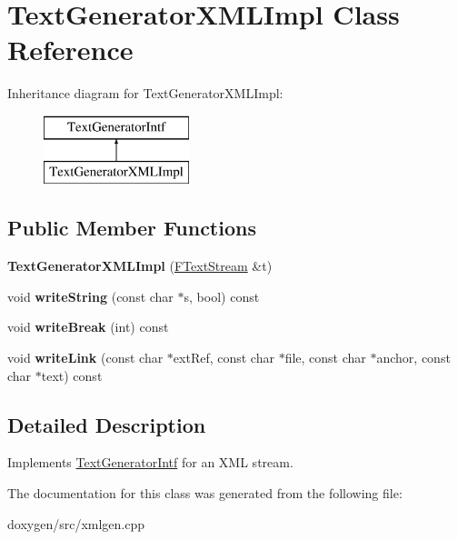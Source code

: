 \hypertarget{class_text_generator_x_m_l_impl}{}\section{Text\+Generator\+X\+M\+L\+Impl Class Reference}
\label{class_text_generator_x_m_l_impl}
Inheritance diagram for Text\+Generator\+X\+M\+L\+Impl\+:\begin{figure}[H]
\begin{center}
\leavevmode
\includegraphics[height=2.000000cm]{class_text_generator_x_m_l_impl}
\end{center}
\end{figure}
\subsection*{Public Member Functions}
\begin{DoxyCompactItemize}
\item 
\mbox{\label{class_text_generator_x_m_l_impl_af632ddc23942a213ab212d47d61face1}} 
{\bfseries Text\+Generator\+X\+M\+L\+Impl} (\mbox{\hyperlink{class_f_text_stream}{F\+Text\+Stream}} \&t)
\item 
\mbox{\label{class_text_generator_x_m_l_impl_a6e7c78ef5f93a34a12c4bf3c90c07517}} 
void {\bfseries write\+String} (const char $\ast$s, bool) const
\item 
\mbox{\label{class_text_generator_x_m_l_impl_a4a7552c7e5fcff6f595371c1113ff948}} 
void {\bfseries write\+Break} (int) const
\item 
\mbox{\label{class_text_generator_x_m_l_impl_a41abaf6a0e80d0c30ca901fd8a6aad60}} 
void {\bfseries write\+Link} (const char $\ast$ext\+Ref, const char $\ast$file, const char $\ast$anchor, const char $\ast$text) const
\end{DoxyCompactItemize}


\subsection{Detailed Description}
Implements \mbox{\hyperlink{class_text_generator_intf}{Text\+Generator\+Intf}} for an X\+ML stream. 

The documentation for this class was generated from the following file\+:\begin{DoxyCompactItemize}
\item 
doxygen/src/xmlgen.\+cpp\end{DoxyCompactItemize}
